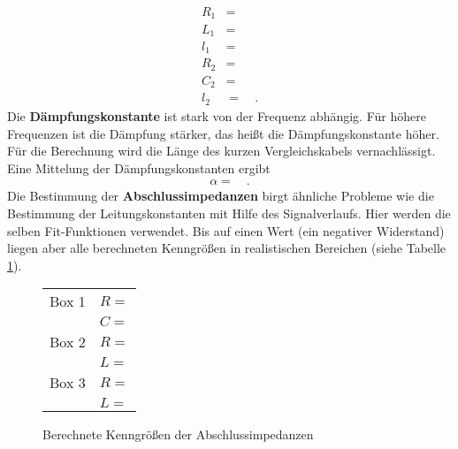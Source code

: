 \begin{align*}
	R_1 &=  \\	
	L _1&=  \\
	l_1 &=  \\
	R_2&=  \\
	C_2 &= 	\\
	l_2 &=  \quad.
\end{align*}
Die \textbf{Dämpfungskonstante} ist stark von der Frequenz abhängig. Für höhere Frequenzen ist die Dämpfung stärker, das heißt die Dämpfungskonstante höher. Für die Berechnung wird die Länge des kurzen Vergleichskabels vernachlässigt. Eine Mittelung der Dämpfungskonstanten ergibt
\begin{align*}
	\alpha =  \quad.
\end{align*}
Die Bestimmung der \textbf{Abschlussimpedanzen} birgt ähnliche Probleme wie die Bestimmung der Leitungskonstanten mit Hilfe des Signalverlaufs. Hier werden die selben Fit-Funktionen verwendet. Bis auf einen Wert (ein negativer Widerstand) liegen aber alle berechneten Kenngrößen in realistischen Bereichen (siehe Tabelle \ref{tab:diskussion}).
\begin{figure}
	\centering
\begin{tabular}{l|l}
	Box 1   & $R=  $ \\
		& $C = $ \\
	\hline  Box 2 &  $R = $ \\
	& $L = $\\ 
	\hline  Box 3 & $R = $ \\
	&$L  = $ \\ 

\end{tabular} 
\caption{Berechnete Kenngrößen der Abschlussimpedanzen}
\label{tab:diskussion}
\end{figure}
